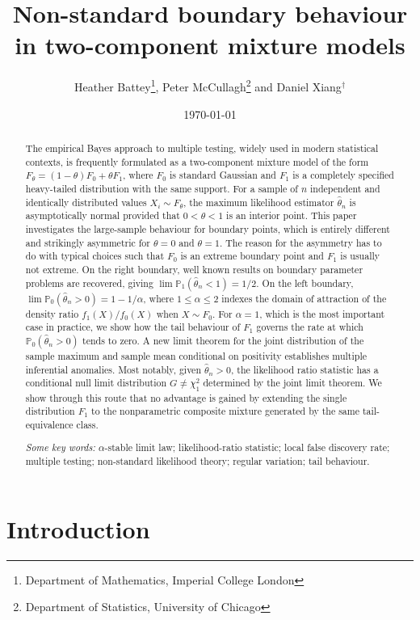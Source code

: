 \documentclass[11pt]{article}
\title{Non-standard boundary behaviour in two-component mixture models}
\author{
  Heather Battey\thanks{Department of Mathematics, Imperial College London}, \quad 
  Peter McCullagh\thanks{Department of Statistics, University of Chicago} \quad and \quad 
  Daniel Xiang$^{\dagger}$
}
\date{\today}
\theoremstyle{definition}
\def\Prob{{\mathbb P}}
\begin{document}
\maketitle

\begin{abstract}

	The empirical Bayes approach to multiple testing, widely used in modern statistical contexts, is frequently formulated as a two-component mixture model of the form $F_\theta = (1-\theta)F_0 + \theta F_1$, where $F_0$ is standard Gaussian and $F_1$ is a completely specified heavy-tailed distribution with the same support. For a sample of $n$ independent and identically distributed values $X_i \sim F_\theta$, the maximum likelihood estimator $\hat\theta_n$ is asymptotically normal provided that $0 < \theta < 1$ is an interior point.  This paper investigates the large-sample behaviour for boundary points, which is entirely different and strikingly asymmetric for $\theta=0$ and $\theta=1$.  The reason for the asymmetry has to do with typical choices such that $F_0$ is an extreme boundary point and $F_1$ is usually not extreme. On the right boundary, well known results on boundary parameter problems are recovered, giving $\lim \Prob_1(\hat\theta_n < 1)=1/2$. On the left boundary, $\lim\Prob_0(\hat\theta_n > 0)=1-1/\alpha$, where $1\leq \alpha \leq 2$ indexes the domain of attraction of the density ratio $f_1(X)/f_0(X)$ when $X\sim F_0$. For $\alpha=1$, which is the most important case in practice, we show how the tail behaviour of $F_1$ governs the rate at which $\Prob_0(\hat\theta_n > 0)$ tends to zero. A new limit theorem for the joint distribution of the sample maximum and sample mean conditional on positivity establishes multiple inferential anomalies. Most notably, given $\hat\theta_n > 0$, the likelihood ratio statistic has a conditional null limit distribution $G\neq\chi^2_1$ determined by the joint limit theorem.  We show through this route that no advantage is gained by extending the single distribution $F_1$ to the nonparametric composite mixture generated by the same tail-equivalence class. \\

\bigskip

\noindent \emph{Some key words:} $\alpha$-stable limit law; 
likelihood-ratio statistic; 
local false discovery rate;
multiple testing;
non-standard likelihood theory;
regular variation;
tail behaviour.
\end{abstract}


\section{Introduction}\label{secIntro}
\end{document}
